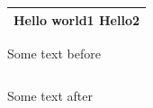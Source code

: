 \documentclass[11pt,a4paper]{article}
\begin{document}
\begin{table}[h]
\begin{tabular}{|l|}
\hline
Hello world1 Hello2 \\ \hline
\end{tabular}
\end{table}

Some text before

\begin{table}[h]
\begin{tabular}{|l|}
\hline
 \\ \hline
\end{tabular}
\end{table}

Some text after
\end{document}

